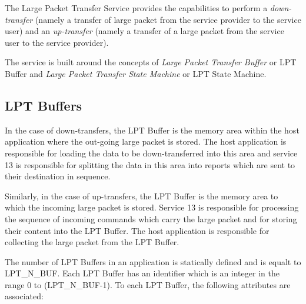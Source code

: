 \documentclass{pnp_article}
\begin{document}
The Large Packet Transfer Service provides the capabilities to perform a \textit{down-transfer} (namely a transfer of large packet from the service provider to the service user) and an \textit{up-transfer} (namely a transfer of a large packet from the service user to the service provider). 

The service is built around the concepts of \textit{Large Packet Transfer Buffer} or LPT Buffer and \textit{Large Packet Transfer State Machine} or LPT State Machine. 

\subsection{LPT Buffers}
In the case of down-transfers, the LPT Buffer is the memory area within the host application where the out-going large packet is stored. The host application is responsible for loading the data to be down-transferred into this area and service 13 is responsible for splitting the data in this area into reports which are sent to their destination in sequence.

Similarly, in the case of up-transfers, the LPT Buffer is the memory area to which the incoming large packet is stored. Service 13 is responsible for processing the sequence of incoming commands which carry the large packet and for storing their content into the LPT Buffer. The host application is responsible for collecting the large packet from the LPT Buffer.

The  number of LPT Buffers in an application is statically defined and is equalt to LPT\_N\_BUF. Each LPT Buffer has an identifier which is an integer in the range 0 to (LPT\_N\_BUF-1). To each LPT Buffer, the following attributes are associated:
\end{document}
